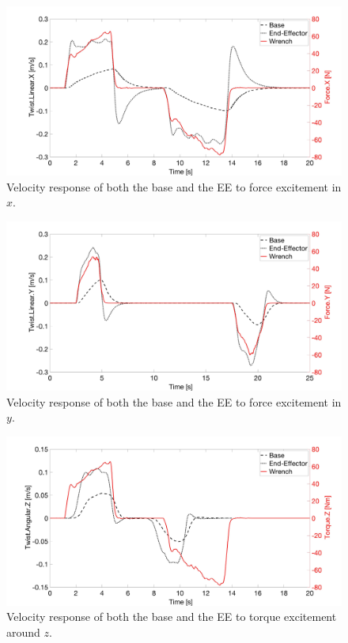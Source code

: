\begin{figure}
   \centering
   \includegraphics[width=\textwidth]{images/test18_x.jpg}
   \caption{Velocity response of both the base and the EE to force excitement in $x$.}
   \label{pics:test18_x}
\end{figure}

\begin{figure}
   \centering
   \includegraphics[width=\textwidth]{images/test18_y.jpg}
   \caption{Velocity response of both the base and the EE to force excitement in $y$.}
   \label{pics:test18_y}
\end{figure}

\begin{figure}
   \centering
   \includegraphics[width=\textwidth]{images/test18_theta.jpg}
   \caption{Velocity response  of both the base and the EE to torque excitement around $z$.}
   \label{pics:test18_theta}
\end{figure}

